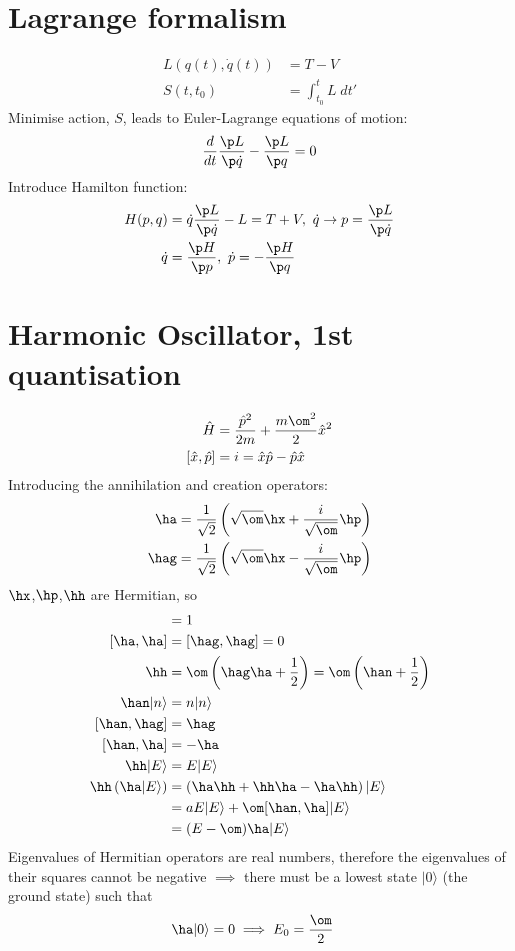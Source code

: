 \documentclass[a4paper, 11pt, normalem]{report}
\begin{document}
\section{Lagrange formalism}
\begin{align}
    L\left(q(t),\dot{q}(t)\right) &= T - V \\
    S(t,t_0) &= \int_{t_0}^t L\; dt'
\end{align}
Minimise action, $S$, leads to Euler-Lagrange equations of motion:
\begin{align}
    \frac{d}{dt} \frac{\p L}{\p\dot{q}} - \frac{\p L}{\p q} = 0
\end{align}
Introduce Hamilton function:
\begin{align}
    H(p,q) &= \dot{q}\frac{\p L}{\p \dot{q}} - L = T+V,~ \dot{q} \to p = \frac{\p L}{\p \dot{q}} \\
    \dot{q} &= \frac{\p H}{\p p},~ \dot{p} = -\frac{\p H}{\p q}
\end{align}

\section{Harmonic Oscillator, 1st quantisation}
\begin{align}
    \hat{H} &= \frac{\hat{p}^2}{2m} + \frac{m\om^2}{2}\hat{x}^2 \\
    [\hat{x},\hat{p}] &= i = \hat{x}\hat{p} - \hat{p}\hat{x}
\end{align}
Introducing the annihilation and creation operators:
\begin{align}
    \ha &= \frac{1}{\sqrt{2}}\left(\sqrt{\om}\hx + \frac{i}{\sqrt{\om}}\hp\right) \\
    \hag &= \frac{1}{\sqrt{2}}\left(\sqrt{\om}\hx - \frac{i}{\sqrt{\om}}\hp\right)
\end{align}
$\hx$,$\hp$,$\hh$ are Hermitian, so
\begin{align}
    [\ha,\hag] &= 1 \\
    [\ha,\ha] &= [\hag,\hag] = 0 \\
    \hh &= \om\left(\hag\ha + \frac12\right) = \om\left(\han+\frac12\right) \\
    \han|n\rangle &= n|n\rangle \\
    [\han,\hag] &= \hag \\
    [\han,\ha] &= -\ha \\
    \hh|E\rangle &= E|E\rangle \\
    \hh\left(\ha|E\rangle\right) &= \left(\ha\hh + \hh\ha - \ha\hh\right)|E\rangle \\
                                         &= aE|E\rangle + \om[\han,\ha]|E\rangle \\
                                         &= (E-\om)\ha|E\rangle
\end{align}
Eigenvalues of Hermitian operators are real numbers, therefore the eigenvalues of their squares cannot be negative $\implies$ there must be a lowest state $|0\rangle$ (the ground state) such that
\begin{align}
    \ha|0\rangle &= 0 \implies E_0 = \frac{\om}{2}
\end{align}
\end{document}
